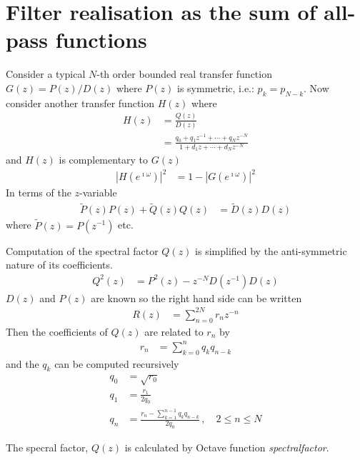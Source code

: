 \documentclass[a4paper,twoside,10pt,english]{report}
\begin{document}
\section{Filter realisation as the sum of all-pass functions}
Consider a typical $N$-th order bounded real transfer function $G\left(z\right)=P\left(z\right)/D\left(z\right)$
where $P\left(z\right)$ is symmetric, i.e.: $p_{k}=p_{N-k}$. Now
consider another transfer function $H\left(z\right)$ where
\begin{align*}
H\left(z\right) &=  \frac{Q\left(z\right)}{D\left(z\right)}\\
 &=  \frac{q_{0}+q_{1}z^{-1}+\cdots+q_{N}z^{-N}}{1+d_{1}z+\cdots+d_{N}z^{-N}}
\end{align*}
and $H\left(z\right)$ is complementary to $G\left(z\right)$
\begin{align*}
\left|H\left(e^{\imath\omega}\right)\right|^{2} 
&=  1-\left|G\left(e^{\imath\omega}\right)\right|^{2}
\end{align*}
In terms of the $z$-variable
\begin{align*}
\tilde{P}\left(z\right)P\left(z\right)+\tilde{Q}\left(z\right)Q\left(z\right) 
&=  \tilde{D}\left(z\right)D\left(z\right)
\end{align*}
where $\tilde{P}\left(z\right)=P\left(z^{-1}\right)$ etc.

Computation of the spectral factor $Q\left(z\right)$ is simplified
by the anti-symmetric nature of its coefficients. 
\begin{align*}
Q^{2}\left(z\right) &= 
P^{2}\left(z\right)-z^{-N}D\left(z^{-1}\right)D\left(z\right)
\end{align*}
$D\left(z\right)$ and $P\left(z\right)$ are known so the right hand
side can be written
\begin{align*}
R\left(z\right) &= \sum_{n=0}^{2N}r_{n}z^{-n}
\end{align*}
Then the coefficients of $Q\left(z\right)$ are related to $r_{n}$ by
\begin{align*}
r_{n} &= \sum_{k=0}^{n}q_{k}q_{n-k}
\end{align*}
and the $q_{k}$ can be computed recursively
\begin{align*}
q_{0} &= \sqrt{r_{0}}\\
q_{1} &= \frac{r_{1}}{2q_{0}}\\
q_{n} &= \frac{r_{n}-\sum_{k=1}^{n-1}q_{k}q_{n-k}}{2q_{0}}\,,\quad2\leq n\leq N
\end{align*}

The specral factor, $Q\left(z\right)$ is calculated by Octave function
\emph{spectralfactor}.
\end{document}
